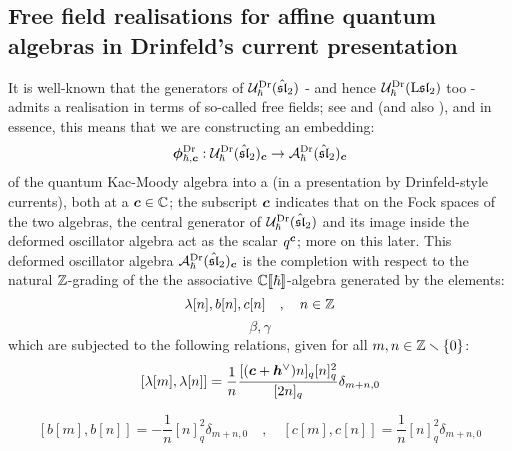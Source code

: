         \subsection{Free field realisations for affine quantum algebras in Drinfeld's current presentation}
            It is well-known that the generators of $\mathcal{U}_{\hbar}^{\mathrm{Dr}}(\hat{\mathfrak{sl}}_2)$ - and hence $\mathcal{U}_{\hbar}^{\mathrm{Dr}}(\mathrm{L} \mathfrak{sl}_2)$ too - admits a realisation in terms of so-called free fields; see \cite{awata_odake_shiraishi_free_boson_realisation_of_quantum_affine_sl_N} and \cite[Section 7]{frenkel_reshetikhin_affine_QUEs_and_deformed_virasoro_and_finite_W_algebras} (and also \cite[Chapter 5]{jimbo_miwa_algebraic_analysis_of_solvable_lattice_models}), and in essence, this means that we are constructing an embedding:
                $$\boldsymbol{\phi}^{\mathrm{Dr}}_{\hbar, \boldsymbol{c}}: \mathcal{U}_{\hbar}^{\mathrm{Dr}}(\hat{\mathfrak{sl}}_2)_{\boldsymbol{c}} \to \mathcal{A}_{\hbar}^{\mathrm{Dr}}(\hat{\mathfrak{sl}}_2)_{\boldsymbol{c}}$$
            of the quantum Kac-Moody algebra into a  (in a presentation by Drinfeld-style currents), both at a  $\boldsymbol{c} \in \mathbb{C}$; the subscript $\boldsymbol{c}$ indicates that on the Fock spaces of the two algebras, the central generator of $\mathcal{U}_{\hbar}^{\mathrm{Dr}}(\hat{\mathfrak{sl}}_2)$ and its image inside the deformed oscillator algebra act as the scalar $q^{\boldsymbol{c}}$; more on this later. This deformed oscillator algebra $\mathcal{A}_{\hbar}^{\mathrm{Dr}}(\hat{\mathfrak{sl}}_2)_{\boldsymbol{c}}$ is the completion with respect to the natural $\mathbb{Z}$-grading of the the associative $\mathbb{C}[\![\hbar]\!]$-algebra generated by the elements:
                $$\lambda[n], b[n], c[n] \quad, \quad n \in \mathbb{Z}$$
                $$\beta, \gamma$$
            which are subjected to the following relations, given for all $m, n \in \mathbb{Z} \smallsetminus \{0\}$:
                \begin{equation} \label{equation: q_deformed_affine_sl_2_oscillator_lambda_commutators}
                    [ \lambda[m], \lambda[n] ] = \frac1n \frac{ [(\boldsymbol{c} + \boldsymbol{h}^{\vee}) n]_q [n]_q^2 }{ [2n]_q } \delta_{m + n, 0}
                \end{equation}
                
                \begin{equation} \label{equation: q_deformed_affine_sl_2_oscillator_bc_commutators}
                    [ b[m], b[n] ] = -\frac1n [n]_q^2 \delta_{m + n, 0} \quad, \quad [ c[m], c[n] ] = \frac1n [n]_q^2 \delta_{m + n, 0}
                \end{equation}
                
